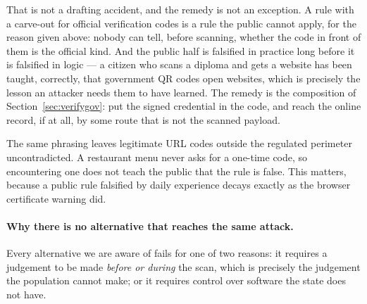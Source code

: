 \documentclass[10pt,a4paper,twocolumn]{article}
\begin{document}
That is not a drafting accident, and the remedy is not an exception. A rule with
a carve-out for official verification codes is a rule the public cannot apply,
for the reason given above: nobody can tell, before scanning, whether the code
in front of them is the official kind. And the public half is falsified in
practice long before it is falsified in logic --- a citizen who scans a diploma
and gets a website has been taught, correctly, that government QR codes open
websites, which is precisely the lesson an attacker needs them to have learned.
The remedy is the composition of Section~\ref{sec:verifygov}: put the signed
credential in the code, and reach the online record, if at all, by some route
that is not the scanned payload.

The same phrasing leaves legitimate URL codes outside the regulated perimeter
uncontradicted. A
restaurant menu never asks for a one-time code, so encountering one does not
teach the public that the rule is false. This matters, because a public rule
falsified by daily experience decays exactly as the browser certificate warning
did.

\paragraph{Why there is no alternative that reaches the same attack.}
Every alternative we are aware of fails for one of two reasons: it requires a
judgement to be made \emph{before or during} the scan, which is precisely the
judgement the population cannot make; or it requires control over software the
state does not have.
\end{document}

